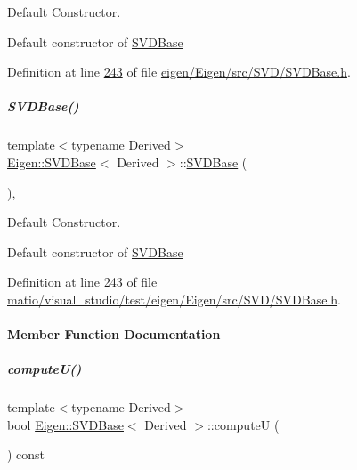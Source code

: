 Default Constructor. 

Default constructor of \hyperlink{group___s_v_d___module_class_eigen_1_1_s_v_d_base}{S\+V\+D\+Base} 

Definition at line \hyperlink{eigen_2_eigen_2src_2_s_v_d_2_s_v_d_base_8h_source_l00243}{243} of file \hyperlink{eigen_2_eigen_2src_2_s_v_d_2_s_v_d_base_8h_source}{eigen/\+Eigen/src/\+S\+V\+D/\+S\+V\+D\+Base.\+h}.

\mbox{\label{group___s_v_d___module_abed06fc6f4b743e1f76a7b317539da87}} 
\subparagraph{\texorpdfstring{S\+V\+D\+Base()}{SVDBase()}\hspace{0.1cm}{\footnotesize\ttfamily [2/2]}}
{\footnotesize\ttfamily template$<$typename Derived$>$ \\
\hyperlink{group___s_v_d___module_class_eigen_1_1_s_v_d_base}{Eigen\+::\+S\+V\+D\+Base}$<$ Derived $>$\+::\hyperlink{group___s_v_d___module_class_eigen_1_1_s_v_d_base}{S\+V\+D\+Base} (\begin{DoxyParamCaption}{ }\end{DoxyParamCaption})\hspace{0.3cm}{\ttfamily [inline]}, {\ttfamily [protected]}}



Default Constructor. 

Default constructor of \hyperlink{group___s_v_d___module_class_eigen_1_1_s_v_d_base}{S\+V\+D\+Base} 

Definition at line \hyperlink{matio_2visual__studio_2test_2eigen_2_eigen_2src_2_s_v_d_2_s_v_d_base_8h_source_l00243}{243} of file \hyperlink{matio_2visual__studio_2test_2eigen_2_eigen_2src_2_s_v_d_2_s_v_d_base_8h_source}{matio/visual\+\_\+studio/test/eigen/\+Eigen/src/\+S\+V\+D/\+S\+V\+D\+Base.\+h}.



\paragraph{Member Function Documentation}
\mbox{\label{group___s_v_d___module_a705a7c2709e1624ccc19aa748a78d473}} 
\subparagraph{\texorpdfstring{compute\+U()}{computeU()}\hspace{0.1cm}{\footnotesize\ttfamily [1/2]}}
{\footnotesize\ttfamily template$<$typename Derived$>$ \\
bool \hyperlink{group___s_v_d___module_class_eigen_1_1_s_v_d_base}{Eigen\+::\+S\+V\+D\+Base}$<$ Derived $>$\+::computeU (\begin{DoxyParamCaption}{ }\end{DoxyParamCaption}) const\hspace{0.3cm}{\ttfamily [inline]}}

